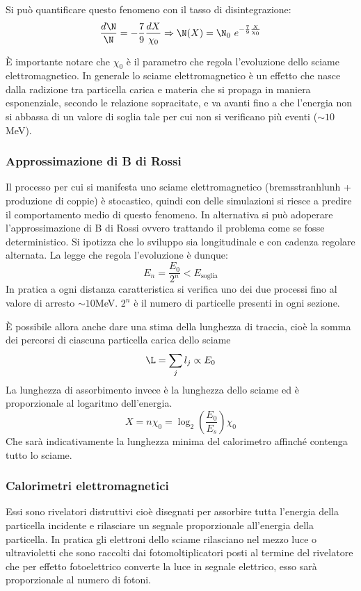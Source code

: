 \documentclass[12pt]{book}
\begin{document}
\begin{enumerate}
\begin{itemize}
	
	Si può quantificare questo fenomeno con il tasso di disintegrazione:
	\begin{equation}
		\frac{d \N}{\N} = - \frac{7}{9} \frac{d X}{\chi_0} \Rightarrow \N (X) = \N_0 \ e^{- \frac{7}{9} \frac{X}{\chi_0}}
	\end{equation}
\end{itemize}

 
È importante notare che $\chi_0$ è il parametro che regola l'evoluzione dello sciame elettromagnetico. In generale lo sciame elettromagnetico è un effetto che nasce dalla radizione tra particella carica e materia che si propaga in maniera esponenziale, secondo le relazione sopracitate, e va avanti fino a che l'energia non si abbassa di un valore di soglia tale per cui non si verificano più eventi ($\sim 10$ MeV). 

\subsubsection{Approssimazione di B di Rossi}
Il processo per cui si manifesta uno sciame elettromagnetico (bremsstranhlunh + produzione di coppie) è stocastico, quindi con delle simulazioni si riesce a predire il comportamento medio di questo fenomeno. In alternativa si può adoperare l'approssimazione di B di Rossi ovvero trattando il problema come se fosse deterministico. Si ipotizza che lo sviluppo sia longitudinale e con cadenza regolare alternata. La legge che regola l'evoluzione è dunque:
\begin{equation}
	E_n = \frac{E_0}{2^n} < E_{\text{soglia}}
\end{equation}
In pratica a ogni distanza caratteristica si verifica uno dei due processi fino al valore di arresto $\sim 10$MeV. $2^n$ è il numero di particelle presenti in ogni sezione. 

È possibile allora anche dare una stima della lunghezza di traccia, cioè la somma dei percorsi di ciascuna particella carica dello sciame
\begin{equation}
	\L=\sum_j l_j \propto E_0
\end{equation}
La lunghezza di assorbimento invece è la lunghezza dello sciame ed è proporzionale al logaritmo dell'energia.
\begin{equation}
	X=n \chi_0 = \log_2 \left( \frac{E_0}{E_s} \right) \chi_0
\end{equation}
Che sarà indicativamente la lunghezza minima del calorimetro affinché contenga tutto lo sciame.

\subsubsection{Calorimetri elettromagnetici}
Essi sono rivelatori distruttivi cioè disegnati per assorbire tutta l'energia della particella incidente e rilasciare un segnale proporzionale all'energia della particella. In pratica gli elettroni dello sciame rilasciano nel mezzo luce o ultravioletti che sono raccolti dai fotomoltiplicatori posti al termine del rivelatore che per effetto fotoelettrico converte la luce in segnale elettrico, esso sarà proporzionale al numero di fotoni.



\end{enumerate}
\end{document}
